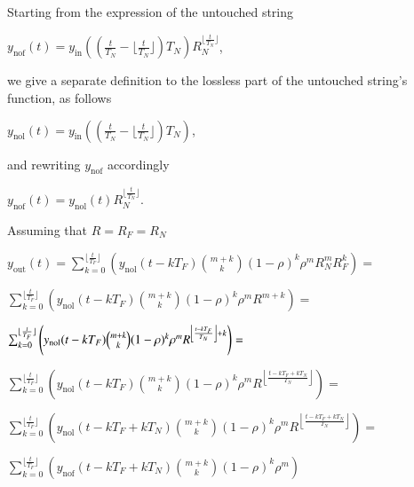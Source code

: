 Starting from the expression of the untouched string

$y_{\textrm{nof}}(t) = y_{\textrm{in}}((\frac{t}{T_N}-\lfloor\frac{t}{T_N}\rfloor)T_N)R_N^{\lfloor\frac{t}{T_N}\rfloor}$,

we give a separate definition to the lossless part of the untouched string's function, as follows

$y_{\textrm{nol}}(t) = y_{\textrm{in}}((\frac{t}{T_N}-\lfloor\frac{t}{T_N}\rfloor)T_N)$,

and rewriting $y_{\textrm{nof}}$ accordingly

$y_{\textrm{nof}}(t) = y_{\textrm{nol}}(t)R_N^{\lfloor\frac{t}{T_N}\rfloor}$.

Assuming that $R=R_F=R_N$

$y_{\textrm{out}}(t) = \sum_{k=0}^{\lfloor \frac{t}{T_F} \rfloor}\left(y_{\textrm{nol}}(t - kT_F)\binom{m+k}{k} (1 - \rho)^{k} \rho^mR_N^{m}R_F^k\right)=$


$\sum_{k=0}^{\lfloor \frac{t}{T_F} \rfloor}\left(y_{\textrm{nol}}(t - kT_F)\binom{m+k}{k} (1 - \rho)^{k} \rho^mR^{m+k}\right)=$

$\sum_{k=0}^{\lfloor \frac{t}{T_F} \rfloor}\left(y_{\textrm{nol}}(t - kT_F)\binom{m+k}{k} (1 - \rho)^{k} \rho^mR^{\left\lfloor \frac{t - kT_F}{T_N} \right\rfloor+k}\right)=$

$\sum_{k=0}^{\lfloor \frac{t}{T_F} \rfloor}\left(y_{\textrm{nol}}(t - kT_F)\binom{m+k}{k} (1 - \rho)^{k} \rho^mR^{\left\lfloor \frac{t - kT_F + kT_N}{T_N} \right\rfloor}\right)=$

$\sum_{k=0}^{\lfloor \frac{t}{T_F} \rfloor}\left(y_{\textrm{nol}}(t - kT_F + kT_N)\binom{m+k}{k} (1 - \rho)^{k} \rho^mR^{\left\lfloor \frac{t - kT_F + kT_N}{T_N} \right\rfloor}\right)=$

$\sum_{k=0}^{\lfloor \frac{t}{T_F} \rfloor}\left(y_{\textrm{nof}}(t - kT_F + kT_N)\binom{m+k}{k} (1 - \rho)^{k} \rho^m\right)$
